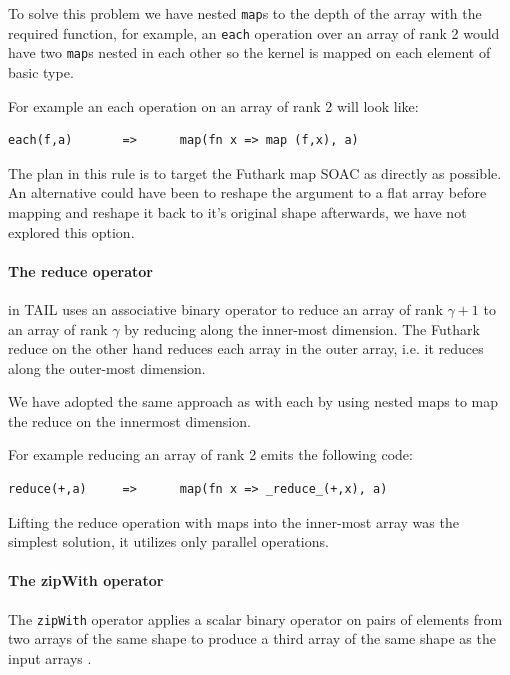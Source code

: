 \documentclass[11pt]{article}
\begin{document}
To solve this problem we have nested {\tt map}s to the depth of the array with the required function,
for example, an {\tt each} operation over an array of rank 2 would have two {\tt map}s nested in each other so the kernel is
mapped on each element of basic type.
 
For example an each operation on an array of rank 2 will look like:
\begin{lstlisting}[numbers=none,frame=none]
each(f,a)       =>      map(fn x => map (f,x), a)
\end{lstlisting}

The plan in this rule is to target the Futhark map SOAC as directly as possible. An alternative could have been to reshape the
argument to a flat array before mapping and reshape it back to it's original shape afterwards, we have not explored this option.

\paragraph{The reduce operator}

in TAIL uses an associative binary operator to reduce an array of rank
$\gamma+1$ to an array of rank $\gamma$ by reducing along the inner-most dimension\cite{ElsmanDybdal:Array:2014}.
The Futhark reduce on the other hand reduces each array in the outer array, i.e. it reduces along the outer-most dimension\cite{TroelsHenriksen}.
 
We have adopted the same approach as with each by using nested maps to map the reduce on the innermost dimension.
 
For example reducing an array of rank 2 emits the following code:
 
\begin{lstlisting}[numbers=none,frame=none]
reduce(+,a)     =>      map(fn x => _reduce_(+,x), a)
\end{lstlisting}

Lifting the reduce operation with maps into the inner-most array was the simplest solution, it utilizes only parallel operations.

\paragraph{The zipWith operator}
The {\tt zipWith} operator applies a scalar binary operator on pairs of elements from two arrays of the same shape to
produce a third array of the same shape as the input arrays \cite{ElsmanDybdal:Array:2014}.
 
\end{document}
